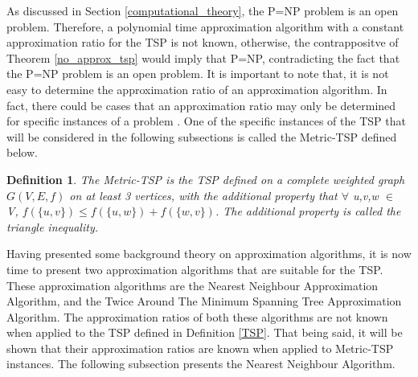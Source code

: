 \documentclass[12pt]{article}
\newtheorem{definition}{Definition}[subsection]
\numberwithin{equation}{subsection}
\numberwithin{table}{subsection}
\numberwithin{algorithm}{subsection}
\numberwithin{figure}{subsection}
\begin{document}
As discussed in Section \ref{computational_theory}, the P=NP problem is an open problem. Therefore, a polynomial time approximation algorithm with a constant approximation ratio for the TSP is not known, otherwise, the contrappositve of Theorem \ref{no_approx_tsp} would imply that P=NP, contradicting the fact that the P=NP problem is an open problem. It is important to note that, it is not easy to determine the approximation ratio of an approximation algorithm. In fact, there could be cases that an approximation ratio may only be determined for specific instances of a problem \cite{cormen_leiserson_rivest_stein}. One of the specific instances of the TSP that will be considered in the following subsections is called the Metric-TSP defined below.
\begin{definition}
\label{Metric-TSP}
The Metric-TSP is the TSP defined on a complete weighted graph $G(V,E,f)$ on at least 3 vertices, with the additional property that $\forall$ u,v,w $\in$ V, $f(\{u,v\}) \leq f(\{u,w\}) + f(\{w,v\})$. The additional property is called the triangle inequality. {}
\end{definition}
 Having presented some background theory on approximation algorithms, it is now time to present two approximation algorithms that are suitable for the TSP. These approximation algorithms are the Nearest Neighbour Approximation Algorithm, and the Twice Around The Minimum Spanning Tree Approximation Algorithm. The approximation ratios of both these algorithms are not known when applied to the TSP defined in Definition \ref{TSP}. That being said, it will be shown that their approximation ratios are known when applied to Metric-TSP instances. The following subsection presents the Nearest Neighbour Algorithm.
\end{document}

